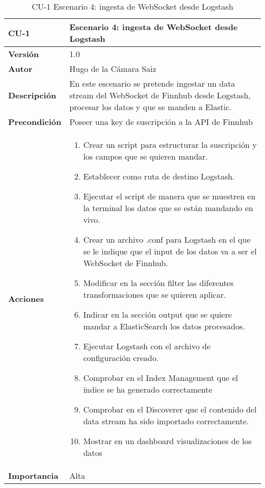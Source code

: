 \begin{table}[p]
	\centering
	\begin{tabularx}{\linewidth}{ p{} p{} }
		\toprule
		\textbf{CU-1}    & \textbf{Escenario 4: ingesta de WebSocket desde Logstash}\\
		\toprule
		\textbf{Versión}              & 1.0    \\
		\textbf{Autor}                & Hugo de la Cámara Saiz \\
		\textbf{Descripción}          & En este escenario se pretende ingestar un data stream del WebSocket de Finnhub desde Logstash, procesar los datos y que se manden a Elastic. \\
		\textbf{Precondición}         & Poseer una key de suscripción a la API de Finnhub \\
		\textbf{Acciones}             &
		\begin{enumerate}
			\def\labelenumi{\arabic{enumi}.}
			\tightlist
			\item Crear un script para estructurar la suscripción y los campos que se quieren mandar.
                \item Establecer como ruta de destino Logstash.
                \item Ejecutar el script de manera que se muestren en la terminal los datos que se están mandando en vivo.
                \item Crear un archivo .conf para Logstash en el que se le indique que el input de los datos va a ser el WebSocket de Finnhub.
                \item Modificar en la sección filter las diferentes transformaciones que se quieren aplicar.
                \item Indicar en la sección output que se quiere mandar a ElasticSearch los datos procesados.
                \item Ejecutar Logstash con el archivo de configuración creado.
                \item Comprobar en el Index Management que el índice se ha generado correctamente
			\item Comprobar en el Discoverer que el contenido del data stream ha sido importado correctamente.
                \item Mostrar en un dashboard visualizaciones de los datos
		\end{enumerate}\\
		\textbf{Importancia}          & Alta \\
		\bottomrule
	\end{tabularx}
	\caption{CU-1 Escenario 4: ingesta de WebSocket desde Logstash}
\end{table}

